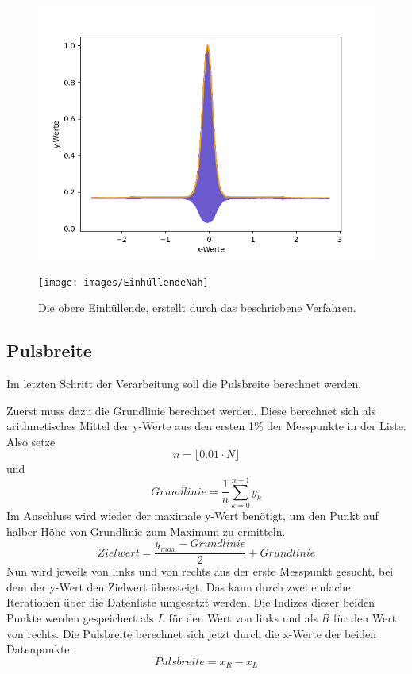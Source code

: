 \begin{figure}[htb]
    \centering
    \begin{minipage}{.5\textwidth}
        \centering
        \includegraphics[width=\linewidth]{images/ObereEinhuellende}
    \end{minipage}%
    \begin{minipage}{.5\textwidth}
        \centering
        \texttt{[image: images/EinhüllendeNah]}
    \end{minipage}
    \caption{Die obere Einhüllende, erstellt durch das beschriebene Verfahren.}
    \label{fig:oberer-einh}
\end{figure}

\subsection{Pulsbreite}\label{subsec:pulsbreite}
Im letzten Schritt der Verarbeitung soll die Pulsbreite berechnet werden.

Zuerst muss dazu die Grundlinie berechnet werden.
Diese berechnet sich als arithmetisches Mittel der y-Werte aus den ersten 1\% der Messpunkte in der Liste.
Also setze
\[
    n = \lfloor0.01 \cdot N \rfloor
\]
und
\[
    Grundlinie = \frac{1}{n} \sum_{k = 0}^{n - 1} y_k
\]
Im Anschluss wird wieder der maximale y-Wert benötigt, um den Punkt auf halber Höhe von Grundlinie zum Maximum zu ermitteln.
\[
    Zielwert = \frac{y_{max} - Grundlinie}{2} + Grundlinie
\]
Nun wird jeweils von links und von rechts aus der erste Messpunkt gesucht, bei dem der y-Wert den Zielwert übersteigt.
Das kann durch zwei einfache Iterationen über die Datenliste umgesetzt werden.
Die Indizes dieser beiden Punkte werden gespeichert als $L$ für den Wert von links und als $R$ für den Wert von rechts.
Die Pulsbreite berechnet sich jetzt durch die x-Werte der beiden Datenpunkte.
\[
    Pulsbreite = x_R - x_L
\]

